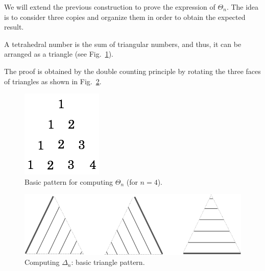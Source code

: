 \noindent {}
\medskip

We will extend the previous construction to prove the expression of $\Theta_n$.
The idea is to consider three copies and organize them in order to obtain the expected result.

A tetrahedral number is the sum of triangular numbers, and thus, it can be arranged as a triangle (see Fig.~\ref{fig:Tetrahedral3}).

The proof is obtained by the double counting principle by rotating the three faces of triangles as shown in Fig.~\ref{fig:Tetrahedral1}.
\begin{figure}[h]
\begin{center}
        \includegraphics[scale=0.4]{FiguresArithmetic/appTetrahedral3}
        \caption{Basic pattern for computing $\Theta_n$ (for $n=4$).}
        \label{fig:Tetrahedral3}
\end{center}
\end{figure}
\begin{figure}[h]
\begin{center}
        \includegraphics[scale=0.3]{FiguresArithmetic/appTetrahedral1}
        \caption{Computing $\Delta_n$: basic triangle pattern.}
        \label{fig:Tetrahedral1}
\end{center}
\end{figure}

